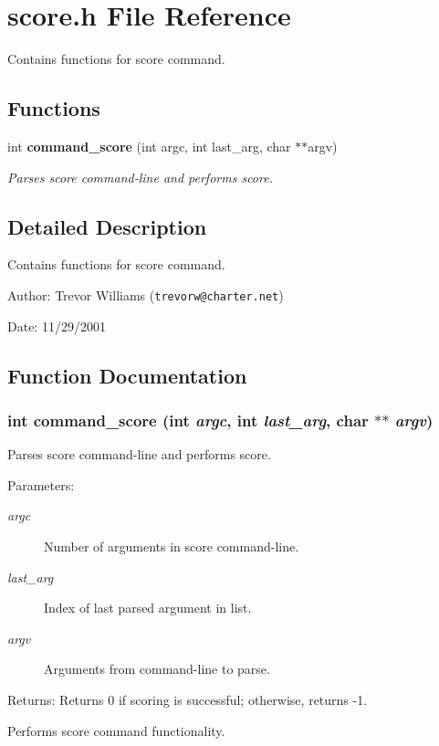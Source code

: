 \section{score.h File Reference}
\label{score_8h}
Contains functions for score command.  


\subsection*{Functions}
\begin{CompactItemize}
\item 
int {\bf command\_\-score} (int argc, int last\_\-arg, char $\ast$$\ast$argv)
\begin{CompactList}\small\item\em Parses score command-line and performs score. \item\end{CompactList}\end{CompactItemize}


\subsection{Detailed Description}
Contains functions for score command. 

\begin{Desc}
\item[Author:]Trevor Williams ({\tt trevorw@charter.net}) \end{Desc}
\begin{Desc}
\item[Date:]11/29/2001 \end{Desc}


\subsection{Function Documentation}
\subsubsection{\setlength{\rightskip}{0pt plus 5cm}int command\_\-score (int {\em argc}, int {\em last\_\-arg}, char $\ast$$\ast$ {\em argv})}\label{score_8h_a0}


Parses score command-line and performs score. 

\begin{Desc}
\item[Parameters:]
\begin{description}
\item[{\em argc}]Number of arguments in score command-line. \item[{\em last\_\-arg}]Index of last parsed argument in list. \item[{\em argv}]Arguments from command-line to parse.\end{description}
\end{Desc}
\begin{Desc}
\item[Returns:]Returns 0 if scoring is successful; otherwise, returns -1.\end{Desc}
Performs score command functionality. 